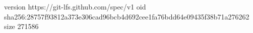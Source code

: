 version https://git-lfs.github.com/spec/v1
oid sha256:28757f93812a373e306cad96bcb4d692cee1fa76bdd64e09435f38b71a276262
size 271586
